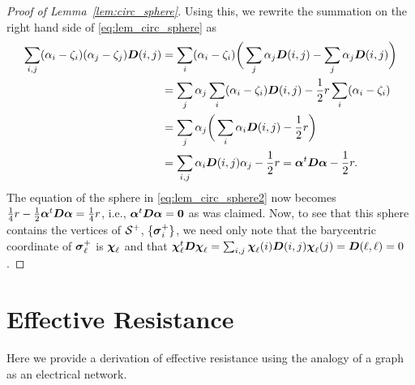 \begin{proof}[Proof of Lemma~\ref{lem:circ_sphere}]
	Using this, we rewrite the summation on the right hand side of \eqref{eq:lem_circ_sphere} as 
	\begin{align*}
	\sum_{i,j}(\alpha_i-\zeta_i)(\alpha_j-\zeta_j)\vb*{D}(i,j) &= \sum_i (\alpha_i-\zeta_i) \bigg(\sum_j\alpha_j \vb*{D}(i,j) - \sum_j \alpha_j \vb*{D}(i,j)\bigg) \\
	&= \sum_j\alpha_j \sum_i (\alpha_i-\zeta_i)\vb*{D}(i,j) - \frac{1}{2}r \sum_i (\alpha_i-\zeta_i) \\
	&= \sum_j \alpha_j \bigg(\sum_i \alpha_i \vb*{D}(i,j) - \frac{1}{2}r \bigg) \\
	&= \sum_{i,j} \alpha_i \vb*{D}(i,j) \alpha_j -\frac{1}{2}r= \vb*{\alpha}^t \vb*{D}\vb*{\alpha} - \frac{1}{2}r.
	\end{align*}
	The equation of the sphere in \eqref{eq:lem_circ_sphere2} now becomes $\frac{1}{4}r - \frac{1}{2}\vb*{\alpha}^t \vb*{D}\vb*{\alpha} = \frac{1}{4}r$, i.e., $\vb*{\alpha}^t \vb*{D}\vb*{\alpha}=\vb{0}$ as was claimed.  Now, to see that this sphere contains the vertices of $\mathcal{S}^+$,  $\{\vb*{\sigma}_i^+\}$, we need only note that the barycentric coordinate of $\vb*{\sigma}_\ell^+$ is $\boldsymbol{\chi}_\ell$ and that $\boldsymbol{\chi}_\ell^t \vb*{D} \boldsymbol{\chi}_\ell = \sum_{i,j} \boldsymbol{\chi}_\ell(i) \vb*{D}(i,j) \boldsymbol{\chi}_\ell(j) = \vb*{D}(\ell,\ell) = 0$. 
\end{proof}







\chapter{Effective Resistance}
\label{sec:app_er}

Here we provide a derivation of effective resistance using the analogy of a graph as an electrical network. 

